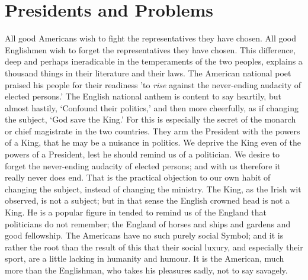 \documentclass{book}
\begin{document}
\chapter{Presidents and Problems}
\label{chapter-7}
All good Americans wish to fight the representatives they have chosen. All good Englishmen wish to forget the representatives they have chosen. This difference, deep and perhaps ineradicable in the temperaments of the two peoples, explains a thousand things in their literature and their laws. The American national poet praised his people for their readiness ’to \emph{rise} against the never-ending audacity of elected persons.’ The English national anthem is content to say heartily, but almost hastily, ‘Confound their politics,’ and then more cheerfully, as if changing the subject, ‘God save the King.’ For this is especially the secret of the monarch or chief magistrate in the two countries. They arm the President with the powers of a King, that he may be a nuisance in politics. We deprive the King even of the powers of a President, lest he should remind us of a politician. We desire to forget the never-ending audacity of elected persons; and with us therefore it really never does end. That is the practical objection to our own habit of changing the subject, instead of changing the ministry. The King, as the Irish wit observed, is not a subject; but in that sense the English crowned head is not a King. He is a popular figure in tended to remind us of the England that politicians do not remember; the England of horses and ships and gardens and good fellowship. The Americans have no such purely social Symbol; and it is rather the root than the result of this that their social luxury, and especially their sport, are a little lacking in humanity and humour. It is the American, much more than the Englishman, who takes his pleasures sadly, not to say savagely.
\end{document}
